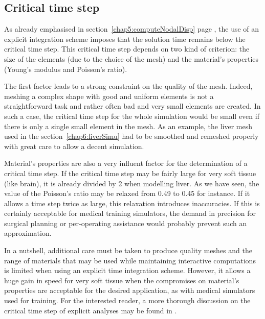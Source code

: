 	\subsection{Critical time step}	\label{chap6:criticalTimestep}
As already emphasised in section~\ref{chap5:computeNodalDisp} page \pageref{chap5:discussionTimestep}, the use of an explicit integration scheme imposes that the solution time remains below the critical time step. This critical time step depends on two kind of criterion: the size of the elements (due to the choice of the mesh) and the material's properties (Young's modulus and Poisson's ratio).

The first factor leads to a strong constraint on the quality of the mesh. Indeed, meshing a complex shape with good and uniform elements is not a straightforward task and rather often bad and very small elements are created. In such a case, the critical time step for the whole simulation would be small even if there is only a single small element in the mesh. As an example, the liver mesh used in the section~\ref{chap6:liverSimu} had to be smoothed and remeshed properly \ON with great care \OFF to allow a decent simulation.

Material's properties are also a very influent factor for the determination of a critical time step. If the critical time step may be fairly large for very soft tissue (like brain), it is already divided by 2 when modelling liver. As we have seen, the value of the Poisson's ratio may be relaxed from 0.49 to 0.45 for instance. If it allows a time step twice as large, this relaxation introduces inaccuracies. If this is certainly acceptable for medical training simulators, the demand in precision for surgical planning or per-operating assistance would probably prevent such an approximation. 

In a nutshell, additional care must be taken to produce quality meshes and the range of materials that may be used while maintaining interactive computations is limited when using an explicit time integration scheme. However, it allows a huge gain in speed for very soft tissue when the compromises on material's properties are acceptable for the desired application, as with medical simulators used for training. For the interested reader, a more thorough discussion on the critical time step of explicit analyses may be found in \cite{Taylor08}. 


